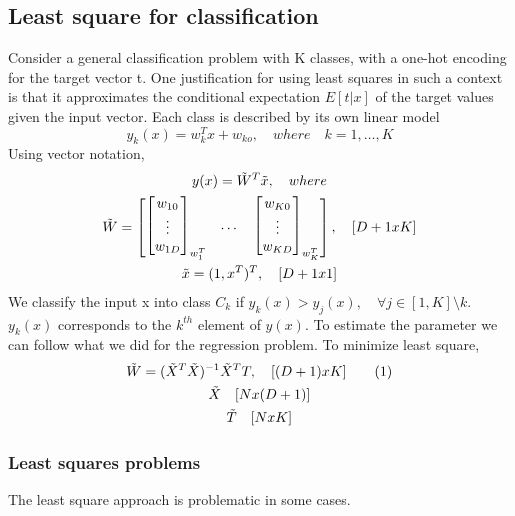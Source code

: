 \documentclass[main.tex]{subfiles}
\newcommand\numberthis{\addtocounter{equation}{1}\tag{\theequation}}
\begin{document}
\subsection{Least square for classification}
Consider a general classification problem with K classes, with a one-hot encoding for the target vector t. One justification for using least squares in such a context is that it approximates the conditional expectation $E[t|x]$ of the target values given the input vector.
Each class is described by its own linear model
\begin{equation}
    y_k(x) = w_k^Tx + w_{ko},\quad where \quad k=1,\dots,K
\end{equation}
Using vector notation,
\begin{gather*}
    y(x) = \Tilde{W}^T \Tilde{x}, \quad where \\
    \Tilde{W}=
    \begin{bmatrix}
        \begin{bmatrix}
            w_{10} \\ \vdots \\ w_{1D}
        \end{bmatrix}_{w_1^T}
         & \dots &
        \begin{bmatrix}
            w_{K0} \\ \vdots \\ w_{KD}
        \end{bmatrix}_{w_K^T}
    \end{bmatrix},\quad [D+1 x K] \\
    \Tilde{x}=(1, x^T)^T, \quad [D+1 x 1]
\end{gather*}
We classify the input x into class $C_k$ if $y_k(x)>y_j(x), \quad \forall j \in [1, K] \setminus k$. $y_k(x)$ corresponds to the $k^{th}$ element of $y(x)$.
To estimate the parameter we can follow what we did for the regression problem. To minimize least square,
\begin{gather*}
    \Tilde{W} = (\Tilde{X}^T \Tilde{X})^{-1} \Tilde{X}^T T, \quad [(D+1) x K] \numberthis \\
    \Tilde{X} \quad [N x (D+1)] \\
    \Tilde{T} \quad [N x K]
\end{gather*}
\subsubsection{Least squares problems}
The least square approach is problematic in some cases.
\end{document}
